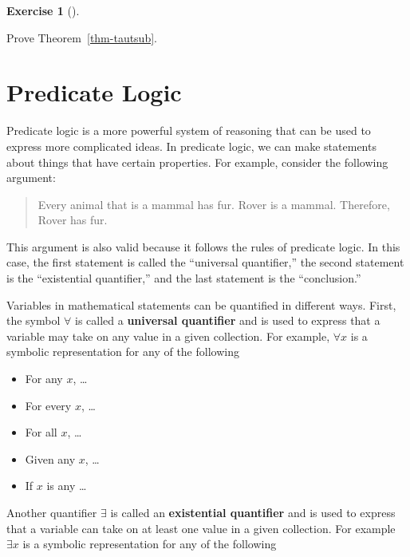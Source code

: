 \documentclass[
  letterpaper,
  10pt,
  reqno,
  twopage,
  openany]{book}
\providecommand{\tightlist}{%
  \setlength{\itemsep}{0pt}\setlength{\parskip}{0pt}}\usepackage{longtable,booktabs,array}
\theoremstyle{plain}
\theoremstyle{definition}
\newtheorem{exercise}{Exercise}[chapter]
\theoremstyle{definition}
\theoremstyle{definition}
\theoremstyle{plain}
\theoremstyle{plain}
\theoremstyle{remark}
\begin{document}
\leavevmode{}%
\begin{exercise}[]\label{exr-tautsub}

Prove Theorem~\ref{thm-tautsub}.

\end{exercise}


\hypertarget{predicate-logic}{%
\chapter{Predicate Logic}\label{predicate-logic}}

Predicate logic is a more powerful system of reasoning that can be used
to express more complicated ideas. In predicate logic, we can make
statements about things that have certain properties. For example,
consider the following argument:

\begin{quote}
Every animal that is a mammal has fur. Rover is a mammal. Therefore,
Rover has fur.
\end{quote}

This argument is also valid because it follows the rules of predicate
logic. In this case, the first statement is called the ``universal
quantifier,'' the second statement is the ``existential quantifier,''
and the last statement is the ``conclusion.''

Variables in mathematical statements can be quantified in different
ways. First, the symbol \(\forall\) is called a
 \textbf{universal quantifier} and is used
to express that a variable may take on any value in a given collection.
For example, \(\forall x\) is a symbolic representation for any of the
following

\begin{itemize}
\tightlist
\item
  For any \(x\), \ldots{}\\
\item
  For every \(x\), \ldots{}\\
\item
  For all \(x\), \ldots{}\\
\item
  Given any \(x\), \ldots{}
\item
  If \(x\) is any \ldots{}
\end{itemize}

Another quantifier \(\exists\) is called an
 \textbf{existential quantifier} and is
used to express that a variable can take on at least one value in a
given collection. For example \(\exists x\) is a symbolic representation
for any of the following
\end{document}
